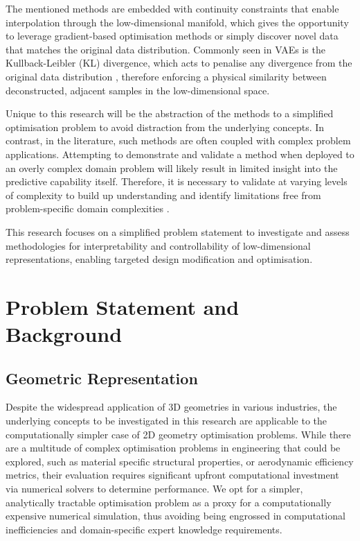 \documentclass{article}
\begin{document}
The mentioned methods are embedded with continuity constraints that enable interpolation through the low-dimensional manifold, which gives the opportunity to leverage gradient-based optimisation methods or simply discover novel data that matches the original data distribution. Commonly seen in VAEs is the Kullback-Leibler (KL) divergence, which acts to penalise any divergence from the original data distribution \citep{Zheng2023}, therefore enforcing a physical similarity between deconstructed, adjacent samples in the low-dimensional space.

Unique to this research will be the abstraction of the methods to a simplified optimisation problem to avoid distraction from the underlying concepts. In contrast, in the literature, such methods are often coupled with complex problem applications. Attempting to demonstrate and validate a method when deployed to an overly complex domain problem will likely result in limited insight into the predictive capability itself. Therefore, it is necessary to validate at varying levels of complexity to build up understanding and identify limitations free from problem-specific domain complexities \citep{Hobbs2021}. 

This research focuses on a simplified problem statement to investigate and assess methodologies for interpretability and controllability of low-dimensional representations, enabling targeted design modification and optimisation.

\newpage

\section{Problem Statement and Background}

\subsection{Geometric Representation}\label{Geometry}

Despite the widespread application of 3D geometries in various industries, the underlying concepts to be investigated in this research are applicable to the computationally simpler case of 2D geometry optimisation problems.  While there are a multitude of complex optimisation problems in engineering that could be explored, such as material specific structural properties, or aerodynamic efficiency metrics, their evaluation requires significant upfront computational investment via numerical solvers to determine performance. We opt for a simpler, analytically tractable optimisation problem as a proxy for a computationally expensive numerical simulation, thus avoiding being engrossed in computational inefficiencies and domain-specific expert knowledge requirements.
\end{document}
